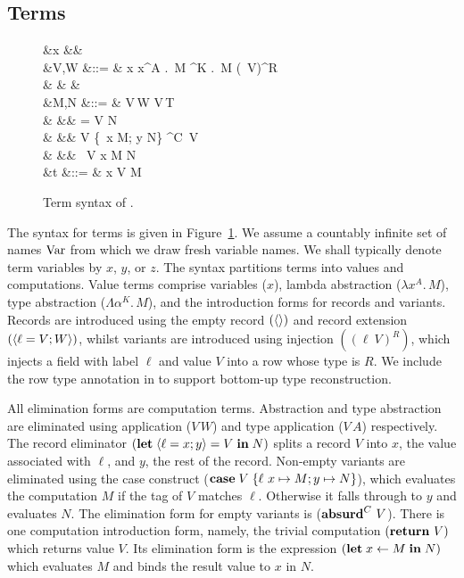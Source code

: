 \documentclass[12pt,phd,lfcs,twoside,openright,logo,leftchapter,normalheadings]{infthesis}
\theoremstyle{plain}
\theoremstyle{definition}
\begin{document}
\subsection{Terms}
\label{sec:base-language-terms}
%
\begin{figure}
\begin{syntax}
     &x \in \VarCat&&\\
        &V,W \in \ValCat  &::= & x
                                        \mid \lambda x^A .\, M \mid \Lambda \alpha^K .\, M
                                        \mid \Record{} \mid {} \mid (\ell~V)^R \\
                     &     &    &\\
  &M,N \in \CompCat  &::= & V\,W \mid V\,T\\
                     &                  &\mid& \Let\;  = V \; \In \; N\\
                     &                  &\mid& \Case\; V \{\ell~x \mapsto M; y \mapsto N\} \mid \Absurd^C~V\\
                     &                  &\mid& \Return~V \mid \Let \; x \revto M \; \In \; N\\
         &t \in \TermCat    &::= & x \mid V \mid M
\end{syntax}

\caption{Term syntax of \BCalc{}.}
\label{fig:base-language-term-syntax}
\end{figure}
%
The syntax for terms is given in
Figure~\ref{fig:base-language-term-syntax}. We assume a countably
infinite set of names $\textrm{Var}$ from which we draw fresh variable
names. We shall typically denote term variables by $x$, $y$, or $z$.
%
The syntax partitions terms into values and computations.
%
Value terms comprise variables ($x$), lambda abstraction
($\lambda x^A . \, M$), type abstraction ($\Lambda \alpha^K . \, M$),
and the introduction forms for records and variants. Records are
introduced using the empty record $(\langle  \rangle)$ and record extension
$(\langle \ell = V; W \rangle)$, whilst variants are introduced using
injection $((\ell~V)^R)$, which injects a field with label $\ell$ and
value $V$ into a row whose type is $R$. We include the row type
annotation in to support bottom-up type reconstruction.

All elimination forms are computation terms. Abstraction and type
abstraction are eliminated using application ($V\,W$) and type
application ($V\,A$) respectively.
%
The record eliminator $(\mathbf{let} \; \langle \ell=x;y \rangle = V \; \mathbf{in} \; N)$
splits a record $V$ into $x$, the value associated with $\ell$, and
$y$, the rest of the record. Non-empty variants are eliminated using
the case construct ($\mathbf{case}\; V\; \{\ell~x \mapsto M; y \mapsto N\}$),
which evaluates the computation $M$ if the tag of $V$ matches
$\ell$. Otherwise it falls through to $y$ and evaluates $N$.  The
elimination form for empty variants is ($\mathbf{absurd}^C~V$).
%
There is one computation introduction form, namely, the trivial
computation $(\mathbf{return}~V)$ which returns value $V$. Its elimination
form is the expression $(\mathbf{let} \; x \leftarrow M \; \mathbf{in} \; N)$ which evaluates
$M$ and binds the result value to $x$ in $N$.
%
\end{document}
